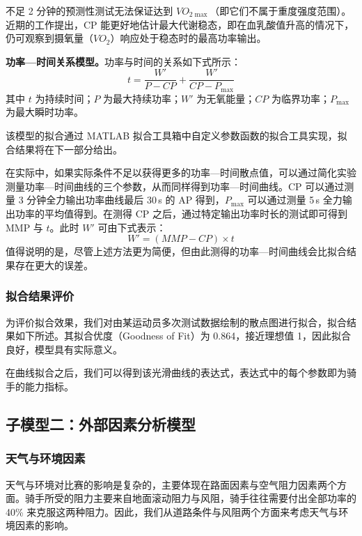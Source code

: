\documentclass[11pt,a4paper]{ctexart}
\begin{document}
不足 2 分钟的预测性测试无法保证达到 $VO_{2\max}$（即它们不属于重度强度范围）。近期的工作提出，CP 能更好地估计最大代谢稳态，即在血乳酸值升高的情况下，仍可观察到摄氧量（$VO_{2}$）响应处于稳态时的最高功率输出。

\textbf{功率—时间关系模型。}功率与时间的关系如下式所示：
\[
t=\frac{W'}{P-CP}+\frac{W'}{CP-P_{\max}}
\]
其中 $t$ 为持续时间；$P$ 为最大持续功率；$W'$ 为无氧能量；$CP$ 为临界功率；$P_{\max}$ 为最大瞬时功率。

该模型的拟合通过 MATLAB 拟合工具箱中自定义参数函数的拟合工具实现，拟合结果将在下一部分给出。

在实际中，如果实际条件不足以获得更多的功率—时间散点值，可以通过简化实验测量功率—时间曲线的三个参数，从而同样得到功率—时间曲线。CP 可以通过测量 3 分钟全力输出功率曲线最后 30\,s 的 AP 得到，$P_{\max}$ 可以通过测量 5\,s 全力输出功率的平均值得到。在测得 CP 之后，通过特定输出功率时长的测试即可得到 MMP 与 $t$。此时 $W'$ 可由下式表示：
\[
W'=(MMP-CP)\times t
\]
值得说明的是，尽管上述方法更为简便，但由此测得的功率—时间曲线会比拟合结果存在更大的误差。

\subsubsection{拟合结果评价}

为评价拟合效果，我们对由某运动员多次测试数据绘制的散点图进行拟合，拟合结果如下所述。其拟合优度（Goodness of Fit）为 0.864，接近理想值 1，因此拟合良好，模型具有实际意义。

在曲线拟合之后，我们可以得到该光滑曲线的表达式，表达式中的每个参数即为骑手的能力指标。

\subsection{子模型二：外部因素分析模型}

\subsubsection{天气与环境因素}

天气与环境对比赛的影响是复杂的，主要体现在路面因素与空气阻力因素两个方面。骑手所受的阻力主要来自地面滚动阻力与风阻，骑手往往需要付出全部功率的 40\% 来克服这两种阻力。因此，我们从道路条件与风阻两个方面来考虑天气与环境因素的影响。
\end{document}

